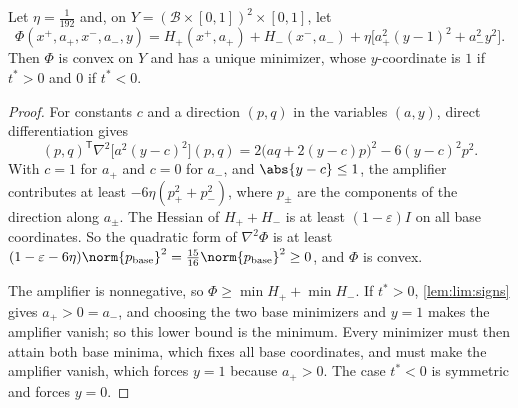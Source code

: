 \begin{lemma}\label{lem:lim:amplifier}
Let $\eta=\frac1{192}$ and, on $Y=(\mathcal B\times[0,1])^2\times[0,1]$, let
\[
 \Phi(x^+,a_+,x^-,a_-,y)=H_+(x^+,a_+)+H_-(x^-,a_-)
 +\eta\bigl[a_+^2(y-1)^2+a_-^2y^2\bigr].
\]
Then $\Phi$ is convex on $Y$ and has a unique minimizer, whose
$y$-coordinate is $1$ if $t^*>0$ and $0$ if $t^*<0$.
\end{lemma}

\begin{proof}
For constants $c$ and a direction $(p,q)$ in the variables $(a,y)$, direct
differentiation gives
\[
 (p,q)^{\mathsf T}\nabla^2\bigl[a^2(y-c)^2\bigr](p,q)
 =2\bigl(aq+2(y-c)p\bigr)^2-6(y-c)^2p^2 .
\]
With $c=1$ for $a_+$ and $c=0$ for $a_-$, and $\abs{y-c}\le1$, the
amplifier contributes at least $-6\eta(p_+^2+p_-^2)$, where $p_\pm$ are the
components of the direction along $a_\pm$. The Hessian of $H_++H_-$ is at
least $(1-\varepsilon)I$ on all base coordinates. So the quadratic form of
$\nabla^2\Phi$ is at least $(1-\varepsilon-6\eta)\norm{p_{\mathrm{base}}}^2
=\frac{15}{16}\norm{p_{\mathrm{base}}}^2\ge0$, and $\Phi$ is convex.

The amplifier is nonnegative, so $\Phi\ge\min H_++\min H_-$. If $t^*>0$,
\cref{lem:lim:signs} gives $a_+>0=a_-$, and choosing the two base
minimizers and $y=1$ makes the amplifier vanish; so this lower bound is the
minimum. Every minimizer must then attain both base minima, which fixes all
base coordinates, and must make the amplifier vanish, which forces $y=1$
because $a_+>0$. The case $t^*<0$ is symmetric and forces $y=0$.
\end{proof}

